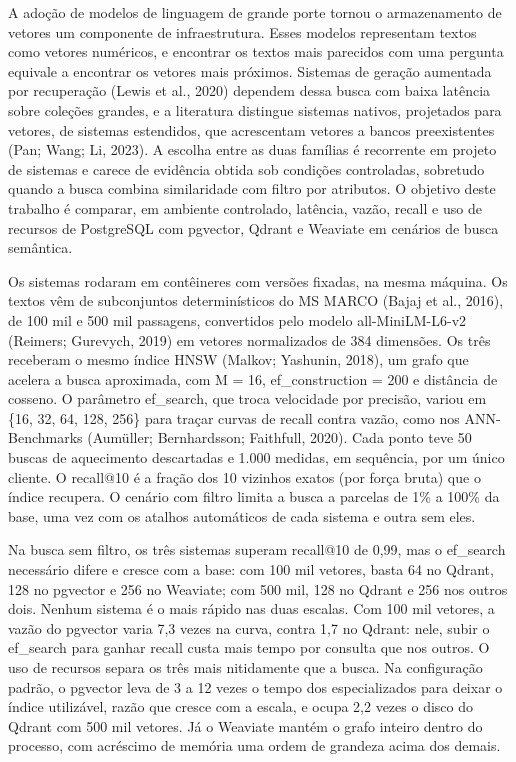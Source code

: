 \documentclass[12pt,a4paper]{article}
\newcommand{\secao}[1]{%
  \par\vspace{6pt}%
  \noindent{\fontsize{12}{14}\selectfont\bfseries #1}\par\vspace{2pt}%
}
\newcommand{\corpo}{\fontsize{10}{12}\selectfont}
\begin{document}
\secao{INTRODUÇÃO}
\corpo
A adoção de modelos de linguagem de grande porte tornou o armazenamento de vetores um componente de infraestrutura. Esses modelos representam textos como vetores numéricos, e encontrar os textos mais parecidos com uma pergunta equivale a encontrar os vetores mais próximos. Sistemas de geração aumentada por recuperação (Lewis et al., 2020) dependem dessa busca com baixa latência sobre coleções grandes, e a literatura distingue sistemas nativos, projetados para vetores, de sistemas estendidos, que acrescentam vetores a bancos preexistentes (Pan; Wang; Li, 2023). A escolha entre as duas famílias é recorrente em projeto de sistemas e carece de evidência obtida sob condições controladas, sobretudo quando a busca combina similaridade com filtro por atributos. O objetivo deste trabalho é comparar, em ambiente controlado, latência, vazão, recall e uso de recursos de PostgreSQL com pgvector, Qdrant e Weaviate em cenários de busca semântica.

\secao{METODOLOGIA}
\corpo
Os sistemas rodaram em contêineres com versões fixadas, na mesma máquina. Os textos vêm de subconjuntos determinísticos do MS MARCO (Bajaj et al., 2016), de 100 mil e 500 mil passagens, convertidos pelo modelo all-MiniLM-L6-v2 (Reimers; Gurevych, 2019) em vetores normalizados de 384 dimensões. Os três receberam o mesmo índice HNSW (Malkov; Yashunin, 2018), um grafo que acelera a busca aproximada, com M = 16, ef\_construction = 200 e distância de cosseno. O parâmetro ef\_search, que troca velocidade por precisão, variou em \{16, 32, 64, 128, 256\} para traçar curvas de recall contra vazão, como nos ANN-Benchmarks (Aumüller; Bernhardsson; Faithfull, 2020). Cada ponto teve 50 buscas de aquecimento descartadas e 1.000 medidas, em sequência, por um único cliente. O recall@10 é a fração dos 10 vizinhos exatos (por força bruta) que o índice recupera. O cenário com filtro limita a busca a parcelas de 1\% a 100\% da base, uma vez com os atalhos automáticos de cada sistema e outra sem eles.

\secao{RESULTADOS E DISCUSSÃO}
\corpo
Na busca sem filtro, os três sistemas superam recall@10 de 0,99, mas o ef\_search necessário difere e cresce com a base: com 100 mil vetores, basta 64 no Qdrant, 128 no pgvector e 256 no Weaviate; com 500 mil, 128 no Qdrant e 256 nos outros dois. Nenhum sistema é o mais rápido nas duas escalas. Com 100 mil vetores, a vazão do pgvector varia 7,3 vezes na curva, contra 1,7 no Qdrant: nele, subir o ef\_search para ganhar recall custa mais tempo por consulta que nos outros. O uso de recursos separa os três mais nitidamente que a busca. Na configuração padrão, o pgvector leva de 3 a 12 vezes o tempo dos especializados para deixar o índice utilizável, razão que cresce com a escala, e ocupa 2,2 vezes o disco do Qdrant com 500 mil vetores. Já o Weaviate mantém o grafo inteiro dentro do processo, com acréscimo de memória uma ordem de grandeza acima dos demais.
\end{document}
